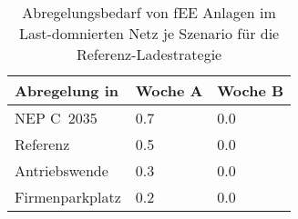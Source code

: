 {
\renewcommand{\arraystretch}{1.2}%
\begin{table}[H]
	\begin{center}
		\caption{Abregelungsbedarf von fEE Anlagen im Last-domnierten Netz je Szenario für die Referenz-Ladestrategie}
		\begin{tabu} to 0.6\textwidth {X[1.5] X[1, r] X[1, r]}
			\toprule
			Abregelung in   \si{\mwh}    & Woche A   & Woche B   \\ \midrule
			NEP C~\num{2035}             & \num{0.7} & \num{0.0} \\
			Referenz                     & \num{0.5} & \num{0.0} \\
			Antriebswende                & \num{0.3} & \num{0.0} \\
			\glqq Firmenparkplatz\grqq{} & \num{0.2} & \num{0.0} \\ \bottomrule
		\end{tabu}
		\label{tab:load_dominated_fee_cur}
	\end{center}
	\vspace{-3mm}%
\end{table}
}